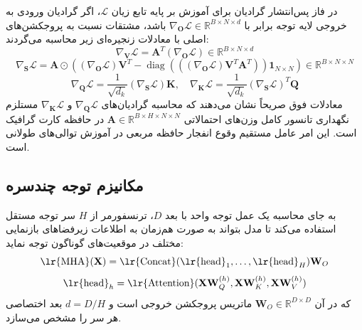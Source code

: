 \documentclass[12pt,a4paper]{report}
\theoremstyle{definition}
\begin{document}
در فاز پس‌انتشار گرادیان  برای آموزش بر پایه تابع زیان $\mathcal{L}$، اگر گرادیان ورودی به خروجی لایه توجه برابر با $\nabla_{\mathbf{O}}\mathcal{L} \in \mathbb{R}^{B \times N \times d}$ باشد، مشتقات نسبت به پروجکشن‌های اصلی با معادلات زنجیره‌ای زیر محاسبه می‌گردند:
\begin{equation}
\nabla_{\mathbf{V}} \mathcal{L} = \mathbf{A}^T (\nabla_{\mathbf{O}} \mathcal{L}) \in \mathbb{R}^{B \times N \times d}
\end{equation}
\begin{equation}
\nabla_{\mathbf{S}} \mathcal{L} = \mathbf{A} \odot \left( (\nabla_{\mathbf{O}} \mathcal{L}) \mathbf{V}^T - \operatorname{diag}\left( ((\nabla_{\mathbf{O}} \mathcal{L}) \mathbf{V}^T \mathbf{A}^T) \right) \mathbf{1}_{N \times N} \right) \in \mathbb{R}^{B \times N \times N}
\end{equation}
\begin{equation}
\nabla_{\mathbf{Q}} \mathcal{L} = \frac{1}{\sqrt{d_k}} (\nabla_{\mathbf{S}} \mathcal{L}) \mathbf{K}, \quad \nabla_{\mathbf{K}} \mathcal{L} = \frac{1}{\sqrt{d_k}} (\nabla_{\mathbf{S}} \mathcal{L})^T \mathbf{Q}
\end{equation}
معادلات فوق صریحاً نشان می‌دهند که محاسبه گرادیان‌های $\nabla_{\mathbf{Q}}\mathcal{L}$ و $\nabla_{\mathbf{K}}\mathcal{L}$ مستلزم نگهداری تانسور کامل وزن‌های احتمالاتی $\mathbf{A} \in \mathbb{R}^{B \times H \times N \times N}$ در حافظه کارت گرافیک است. این امر عامل مستقیم وقوع انفجار حافظه مربعی در آموزش توالی‌های طولانی است.

\subsection{مکانیزم توجه چندسره }
به جای محاسبه یک عمل توجه واحد با بعد $D$، ترنسفورمر از $H$ سر توجه مستقل استفاده می‌کند تا مدل بتواند به صورت هم‌زمان به اطلاعات زیرفضاهای بازنمایی مختلف در موقعیت‌های گوناگون توجه نماید:
\begin{equation}
\text{\lr{MHA}}(\mathbf{X}) = \text{\lr{Concat}}(\text{\lr{head}}_1, \dots, \text{\lr{head}}_H)\mathbf{W}_O
\end{equation}
\begin{equation}
\text{\lr{head}}_h = \text{\lr{Attention}}(\mathbf{X}\mathbf{W}_Q^{(h)}, \mathbf{X}\mathbf{W}_K^{(h)}, \mathbf{X}\mathbf{W}_V^{(h)})
\end{equation}
که در آن $\mathbf{W}_O \in \mathbb{R}^{D \times D}$ ماتریس پروجکشن خروجی است و $d = D/H$ بعد اختصاصی هر سر را مشخص می‌سازد.
\end{document}
